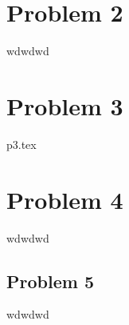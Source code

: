 \documentclass[a4paper]{article}
\begin{document}
    \section{Problem 2}\label{subsec:problem-2}
    wdwdwd

    \section{Problem 3}\label{subsec:problem-3}
    {p3.tex}

    \section{Problem 4}\label{subsec:problem-4}
    wdwdwd

    \subsection{Problem 5}
    wdwdwd
\end{document}

